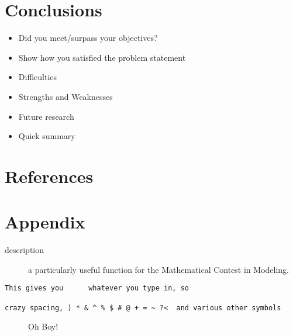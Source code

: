 \documentclass[10pt]{article}
\begin{document}
\section{Conclusions}
\begin{itemize}
\item Did you meet/surpass your objectives?
\item Show how you satisfied the problem statement
\item Difficulties
\item Strengths and Weaknesses
\item Future research
\item Quick summary
\end{itemize}
\section{References}
\section{Appendix}

\begin{description}
\item[description] a particularly useful function for the Mathematical Contest in Modeling.
\end{description}
\begin{verbatim}
This gives you      whatever you type in, so

crazy spacing, ) * & ^ % $ # @ + = ~ ?<  and various other symbols
\end{verbatim}

\begin{figure}[htp]
\begin{center}
\end{center}
\caption{Oh Boy!}
\label{fig:space}
\end{figure}
\end{document}
